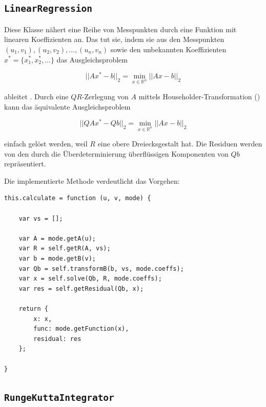 \documentclass[11pt]{scrreprt} %
\theoremstyle{definition}
\begin{document}
\subsection{{\tt LinearRegression}}

Diese Klasse nähert eine Reihe von Messpunkten durch eine Funktion mit linearen Koeffizienten an. Das tut sie, indem sie aus den Messpunkten $(u_1, v_1), (u_2, v_2), \dots, (u_n, v_n)$ sowie den unbekannten Koeffizienten $x^* = \{x^*_1, x^*_2, \dots\}$ das Ausgleichsproblem

\[
||Ax^* - b||_2 = \min_{x \in \mathbb{R}^n} ||Ax - b||_2
\]

%

ableitet \cite{massjung}. Durch eine $QR$-Zerlegung von $A$ mittels Householder-Transformation (\cite{wiki:householder}) kann das äquivalente Ausgleichsproblem 

\[
||QAx^* - Qb||_2 = \min_{x \in \mathbb{R}^n} ||Ax - b||_2
\]

einfach gelöst werden, weil $R$ eine obere Dreiecksgestalt hat. Die Residuen werden von den durch die Überdeterminierung überflüssigen Komponenten von $Qb$ repräsentiert.

Die implementierte Methode verdeutlicht das Vorgehen:

\begin{lstlisting}
this.calculate = function (u, v, mode) {
	
	var vs = [];
		
	var A = mode.getA(u);
	var R = self.getR(A, vs);
	var b = mode.getB(v);
	var Qb = self.transformB(b, vs, mode.coeffs);
	var x = self.solve(Qb, R, mode.coeffs);
	var res = self.getResidual(Qb, x);
				
	return {
		x: x,
		func: mode.getFunction(x),
		residual: res
	};
		
}
\end{lstlisting}

\subsection{{\tt RungeKuttaIntegrator}}
\end{document}

